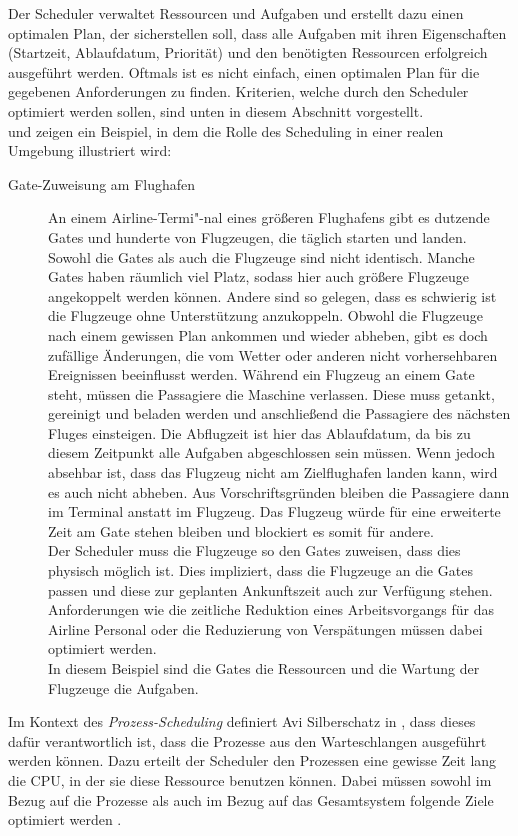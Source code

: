 Der Scheduler verwaltet Ressourcen und Aufgaben und erstellt dazu einen optimalen Plan, der sicherstellen soll, dass alle Aufgaben mit ihren Eigenschaften (Startzeit, Ablaufdatum, Priorität) und den benötigten Ressourcen erfolgreich ausgeführt werden. Oftmals ist es nicht einfach, einen optimalen Plan für die gegebenen Anforderungen zu finden. Kriterien, welche durch den Scheduler optimiert werden sollen, sind unten in diesem Abschnitt vorgestellt.\\
\cite{mpinedo} und \cite{aagnetis} zeigen ein Beispiel, in dem die Rolle des Scheduling in einer realen Umgebung illustriert wird:
\begin{description}
\item[Gate-Zuweisung am Flughafen]
An einem Airline-Termi"-nal eines größeren Flughafens gibt es dutzende Gates und hunderte von Flugzeugen, die täglich starten und landen. Sowohl die Gates als auch die Flugzeuge sind nicht identisch. Manche Gates haben räumlich viel Platz, sodass hier auch größere Flugzeuge angekoppelt werden können. Andere sind so gelegen, dass es schwierig ist die Flugzeuge ohne Unterstützung anzukoppeln. Obwohl die Flugzeuge nach einem gewissen Plan ankommen und wieder abheben, gibt es doch zufällige Änderungen, die vom Wetter oder anderen nicht vorhersehbaren Ereignissen beeinflusst werden. Während ein Flugzeug an einem Gate steht, müssen die Passagiere die Maschine verlassen. Diese muss getankt, gereinigt und beladen werden und anschließend die Passagiere des nächsten Fluges einsteigen. Die Abflugzeit ist hier das Ablaufdatum, da bis zu diesem Zeitpunkt alle Aufgaben abgeschlossen sein müssen. Wenn jedoch absehbar ist, dass das Flugzeug nicht am Zielflughafen landen kann, wird es auch nicht abheben. Aus Vorschriftsgründen bleiben die Passagiere dann im Terminal anstatt im Flugzeug. Das Flugzeug würde für eine erweiterte Zeit am Gate stehen bleiben und blockiert es somit für andere.\\
Der Scheduler muss die Flugzeuge so den Gates zuweisen, dass dies physisch möglich ist. Dies impliziert, dass die Flugzeuge an die Gates passen und diese zur geplanten Ankunftszeit auch zur Verfügung stehen. Anforderungen wie die zeitliche Reduktion eines Arbeitsvorgangs für das Airline Personal oder die Reduzierung von Verspätungen müssen dabei optimiert werden.\\
In diesem Beispiel sind die Gates die Ressourcen und die Wartung der Flugzeuge die Aufgaben. 
\end{description}
Im Kontext des \textit{Prozess-Scheduling} definiert Avi Silberschatz in \cite{asilberschatz}, dass dieses dafür verantwortlich ist, dass die Prozesse aus den Warteschlangen ausgeführt werden können. Dazu erteilt der Scheduler den Prozessen eine gewisse Zeit lang die CPU, in der sie diese Ressource benutzen können. Dabei müssen sowohl im Bezug auf die Prozesse als auch im Bezug auf das Gesamtsystem folgende Ziele optimiert werden \cite{asilberschatz} \cite{rlove}.
